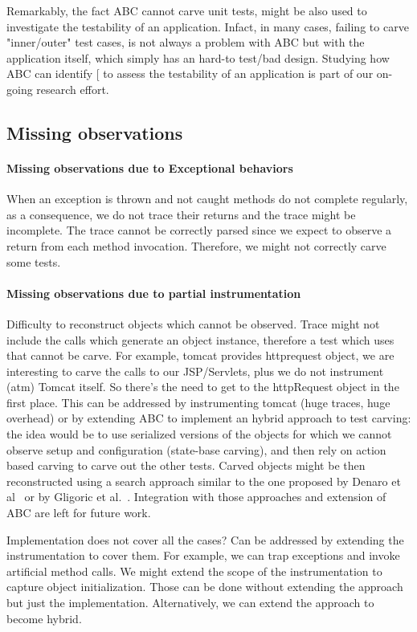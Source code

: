 \documentclass[10pt,conference]{IEEEtran}
\makeatletter
\gdef\xxx{\@ifnextchar[\xxx@lab\xxx@nolab}
\newcommand{\abc}{\textsf{ABC}\xspace}
\makeatother
\begin{document}
Remarkably, the fact \abc cannot carve unit tests, might be also used to investigate the testability of an application. Infact, in many cases, failing to carve "inner/outer" test cases, is not always a problem with \abc but with the application itself, which simply has an hard-to test/bad design. Studying how \abc can identify \xxx{code smells} to assess the testability of an application is part of our on-going research effort.

\subsection{Missing observations}

\paragraph{Missing observations due to Exceptional behaviors}

When an exception is thrown and not caught methods do not complete regularly, as a consequence, we do not trace their returns and the trace might be incomplete. The trace cannot be correctly parsed since we expect to observe a return from each method invocation.  Therefore, we might not correctly carve some tests.

\paragraph{Missing observations due to partial instrumentation}
Difficulty to reconstruct objects which cannot be observed. Trace might not include the calls which generate an object instance, therefore a test which uses that cannot be carve. For example, tomcat provides httprequest object, we are interesting to carve the calls to our JSP/Servlets, plus we do not instrument (atm) Tomcat itself. So there's the need to get to the httpRequest object in the first place. This can be addressed by instrumenting tomcat (huge traces, huge overhead) or by extending \abc to implement an hybrid approach to test carving: the idea would be to use serialized versions of the objects for which we cannot observe setup and configuration (state-base carving), and then rely on action based carving to carve out the other tests. Carved objects might be then reconstructed using a search approach similar to the one proposed by Denaro et al~\cite{} or by Gligoric et al.~\cite{}. Integration with those approaches and extension of \abc are left for future work.

Implementation does not cover all the cases? Can be addressed by extending the instrumentation to cover them.
For example, we can trap exceptions and invoke artificial method calls. We might extend the scope of the instrumentation to capture object initialization. Those can be done without extending the approach but just the implementation. Alternatively, we can extend the approach to become hybrid.
\end{document}
